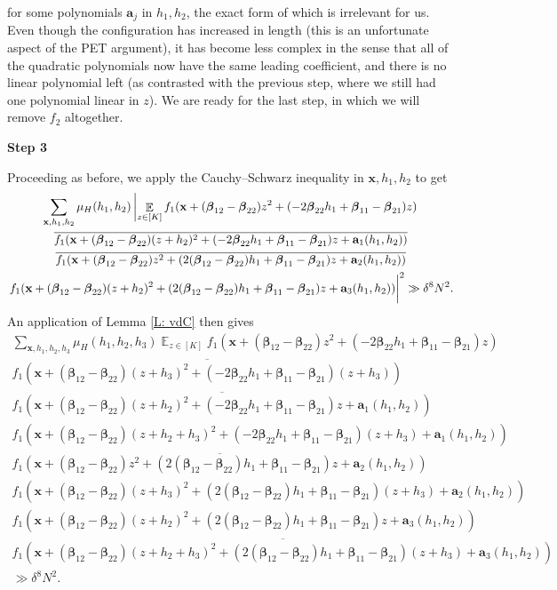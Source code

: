 \documentclass[11pt]{amsart}
\theoremstyle{definition}
\DeclareMathOperator*{\E}{\mathbb{E}}
\newcommand{\ba}{{\mathbf{a}}}
\newcommand{\bx}{{\mathbf{x}}}
\newcommand{\bbeta}{{\boldsymbol{\beta}}}
\begin{document}
for some polynomials $\ba_j$ in $h_1, h_2$, the exact form of which is irrelevant for us. Even though the configuration has increased in length (this is an unfortunate aspect of the PET argument), it has become less complex in the sense that all of the quadratic polynomials now have the same leading coefficient, and there is no linear polynomial left (as contrasted with the previous step, where we still had one polynomial linear in $z$). We are ready for the last step, in which we will remove $f_2$ altogether.

\smallskip
\textbf{Step 3}
\smallskip

Proceeding as before, we apply the Cauchy--Schwarz inequality in $\bx, h_1, h_2$ to get
\begin{multline*}
    \sum_{\bx, h_1, h_2}\mu_H(h_1, h_2)\left|\E_{z\in[K]}f_1(\bx + (\bbeta_{12}-\bbeta_{22})z^2 + (-2\bbeta_{22}h_1+\bbeta_{11}-\bbeta_{21})z)\right.\\
    \overline{f_1(\bx + (\bbeta_{12}-\bbeta_{22})(z+h_2)^2 + (-2\bbeta_{22}h_1+\bbeta_{11}-\bbeta_{21})z + \ba_1(h_1, h_2))}\\
    \overline{f_1(\bx + (\bbeta_{12}-\bbeta_{22})z^2 + (2(\bbeta_{12}-\bbeta_{22})h_1+\bbeta_{11}-\bbeta_{21} )z + \ba_2(h_1,h_2))}\\
    \left.\vphantom{\E_{z\in[K]}} {f_1(\bx + (\bbeta_{12}-\bbeta_{22})(z+h_2)^2 + (2(\bbeta_{12}-\bbeta_{22})h_1+\bbeta_{11}-\bbeta_{21} )z +  \ba_3(h_1,h_2))}\right|^2\gg \delta^8 N^2. 
\end{multline*}
An application of Lemma \ref{L: vdC} then gives
\begin{multline*}
    \sum_{\bx, h_1, h_2, h_3}\mu_H(h_1, h_2, h_3)\E_{z\in[K]}f_1(\bx + (\bbeta_{12}-\bbeta_{22})z^2 + (-2\bbeta_{22}h_1+\bbeta_{11}-\bbeta_{21})z)\\
    \overline{f_1(\bx + (\bbeta_{12}-\bbeta_{22})(z+h_3)^2 + (-2\bbeta_{22}h_1+\bbeta_{11}-\bbeta_{21})(z+h_3))}\\
    \overline{f_1(\bx + (\bbeta_{12}-\bbeta_{22})(z+h_2)^2 + (-2\bbeta_{22}h_1+\bbeta_{11}-\bbeta_{21})z + \ba_1(h_1, h_2))}\\
    {f_1(\bx + (\bbeta_{12}-\bbeta_{22})(z+h_2+h_3)^2 + (-2\bbeta_{22}h_1+\bbeta_{11}-\bbeta_{21})(z+h_3) + \ba_1(h_1, h_2))}\\
    \overline{f_1(\bx + (\bbeta_{12}-\bbeta_{22})z^2 + (2(\bbeta_{12}-\bbeta_{22})h_1+\bbeta_{11}-\bbeta_{21} )z + \ba_2(h_1,h_2))}\\
    {f_1(\bx + (\bbeta_{12}-\bbeta_{22})(z+h_3)^2 + (2(\bbeta_{12}-\bbeta_{22})h_1+\bbeta_{11}-\bbeta_{21})(z+h_3) + \ba_2(h_1,h_2))}\\
    {f_1(\bx + (\bbeta_{12}-\bbeta_{22})(z+h_2)^2 + (2(\bbeta_{12}-\bbeta_{22})h_1+\bbeta_{11}-\bbeta_{21} )z +  \ba_3(h_1,h_2))}\\
    \overline{f_1(\bx + (\bbeta_{12}-\bbeta_{22})(z+h_2+h_3)^2 + (2(\bbeta_{12}-\bbeta_{22})h_1+\bbeta_{11}-\bbeta_{21} )(z+h_3) +  \ba_3(h_1,h_2))}\\
    \gg \delta^8 N^2. 
\end{multline*}
\end{document}
